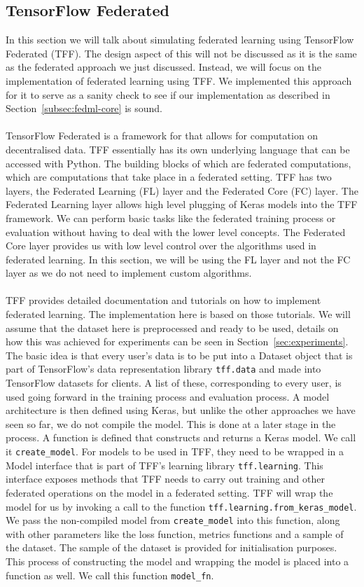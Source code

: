 \documentclass[12pt]{article}
\begin{document}
\subsection{TensorFlow Federated}\label{subsec:tff}
In this section we will talk about simulating federated learning using TensorFlow Federated (TFF). The design aspect of this will not be discussed as it is the same as the federated approach we just discussed. Instead, we will focus on the implementation of federated learning using TFF. We implemented this approach for it to serve as a sanity check to see if our implementation as described in Section~\ref{subsec:fedml-core} is sound. 
\\\\
TensorFlow Federated is a framework for that allows for computation on decentralised data. TFF essentially has its own underlying language that can be accessed with Python. The building blocks of which are federated computations, which are computations that take place in a federated setting. TFF has two layers, the Federated Learning (FL) layer and the Federated Core (FC) layer. The Federated Learning layer allows high level plugging of Keras models into the TFF framework. We can perform basic tasks like the federated training process or evaluation without having to deal with the lower level concepts. The Federated Core layer provides us with low level control over the algorithms used in federated learning. In this section, we will be using the FL layer and not the FC layer as we do not need to implement custom algorithms. 
\\\\
TFF provides detailed documentation and tutorials on how to implement federated learning. The implementation here is based on those tutorials. We will assume that the dataset here is preprocessed and ready to be used, details on how this was achieved for experiments can be seen in Section~\ref{sec:experiments}. The basic idea is that every user's data is to be put into a Dataset object that is part of TensorFlow's data representation library \texttt{tff.data} and made into TensorFlow datasets for clients. A list of these, corresponding to every user, is used going forward in the training process and evaluation process. A model architecture is then defined using Keras, but unlike the other approaches we have seen so far, we do not compile the model. This is done at a later stage in the process. A function is defined that constructs and returns a Keras model. We call it \texttt{create\_model}. For models to be used in TFF, they need to be wrapped in a Model interface that is part of TFF's learning library \texttt{tff.learning}. This interface exposes methods that TFF needs to carry out training and other federated operations on the model in a federated setting. TFF will wrap the model for us by invoking a call to the function \texttt{tff.learning.from\_keras\_model}. We pass the non-compiled model from \texttt{create\_model} into this function, along with other parameters like the loss function, metrics functions and a sample of the dataset. The sample of the dataset is provided for initialisation purposes. This process of constructing the model and wrapping the model is placed into a function as well. We call this function \texttt{model\_fn}.
\end{document}
